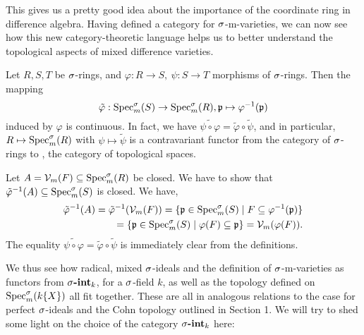 This gives us a pretty good idea about the importance of the coordinate ring in difference algebra.
Having defined a category for $\sigma$-m-varieties, we can now see how this new category-theoretic language helps us to better understand the topological aspects of mixed difference varieties.

\begin{lem}\label{inducedcont}
Let $R,S,T$ be $\sigma$-rings, and $\varphi: R \rightarrow S,~ \psi: S \rightarrow T$ morphisms of $\sigma$-rings. Then the mapping $$\tilde \varphi: \operatorname{Spec}^\sigma_m(S) \rightarrow \operatorname{Spec}^\sigma_m(R), \mathfrak{p} \mapsto \varphi^{-1}(\mathfrak{p})$$ 
induced by $\varphi$ is continuous. 
In fact, we have $\widetilde{ \psi \circ \varphi} = \tilde \varphi \circ \tilde \psi$, and in particular, $R \mapsto \operatorname{Spec}^\sigma_m(R)$ with $\psi \mapsto\tilde \psi$ is a contravariant functor from the category of $\sigma$-rings to \Top, the category of topological spaces.
\begin{bew}
Let $A = \mathcal{V}_m(F) \subseteq \operatorname{Spec}^\sigma_m(R)$ be closed. We have to show that $\tilde \varphi^{-1}(A) \subseteq \operatorname{Spec}^\sigma_m(S)$ is closed.
We have, 
\begin{align*} \tilde \varphi^{-1}(A) = \tilde \varphi^{-1}(\mathcal{V}_m(F)) = \{ \mathfrak{p} \in \operatorname{Spec}^\sigma_m(S) \mid F \subseteq \varphi^{-1}(\mathfrak{p}) \} \\ = \{\mathfrak{p} \in \operatorname{Spec}^\sigma_m(S) \mid \varphi(F) \subseteq \mathfrak{p} \} = \mathcal{V}_m(\varphi(F)). \end{align*}
The equality $\widetilde{ \psi \circ \varphi} = \tilde \varphi \circ \tilde \psi$ is immediately clear from the definitions.
\end{bew}
\end{lem}

We thus see how radical, mixed $\sigma$-ideals and the definition of $\sigma$-m-varieties as functors from $\sigma\text{{\normalfont\textbf{-int}}}_k$, for a $\sigma$-field $k$, as well as the topology defined on $\operatorname{Spec}^\sigma_m(k\{X\})$ all fit together. 
These are all in analogous relations to the case for perfect $\sigma$-ideals and the Cohn topology outlined in Section 1. We will try to shed some light on the choice of the category $\sigma\text{{\normalfont\textbf{-int}}}_k$ here:

